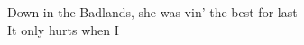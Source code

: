 \songwordfb{} Down in the Badlands, she was vin' the best for last \\
\songwordfb{} It only hurts when I  \\



